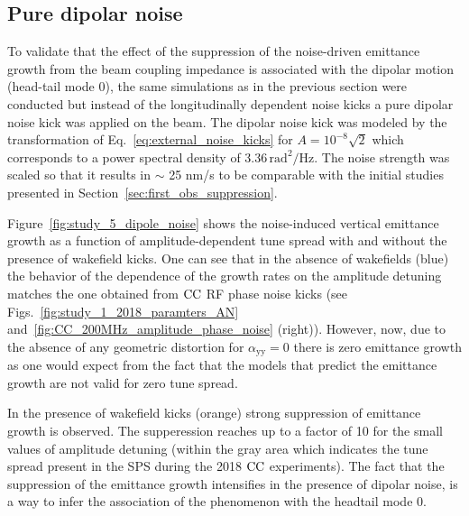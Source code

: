 

\subsection{Pure dipolar noise}\label{subsec:dipole_noise}
To validate that the effect of the suppression of the noise-driven emittance growth from the beam coupling impedance is associated with the dipolar motion (head-tail mode 0), the same simulations as in the previous section were conducted but instead of the longitudinally dependent noise kicks a pure dipolar noise kick was applied on the beam. The dipolar noise kick was modeled by the transformation of Eq.~\eqref{eq:external_noise_kicks} for $A=10^{-8} \sqrt{2}$ which corresponds to a power spectral density of 3.36\,$\mathrm{rad^2/Hz}$. The noise strength was scaled so that it results in $\sim$ 25 nm/s to be comparable with the initial studies presented in Section~\ref{sec:first_obs_suppression}.

Figure~\ref{fig:study_5_dipole_noise} shows the noise-induced vertical emittance growth as a function of amplitude-dependent tune spread with and without the presence of wakefield kicks. One can see that in the absence of wakefields (blue) the behavior of the dependence of the growth rates on the amplitude detuning matches the one obtained from ${\mathrm{CC}}$ RF phase noise kicks (see Figs.~\ref{fig:study_1_2018_paramters_AN} and~\ref{fig:CC_200MHz_amplitude_phase_noise} (right)). However, now, due to the absence of any geometric distortion for $\alpha_\mathrm{yy}=0$ there is zero emittance growth as one would expect from the fact that the models that predict the emittance growth are not valid for zero tune spread.

In the presence of wakefield kicks (orange) strong suppression of emittance growth is observed. The supperession reaches up to a factor of 10 for the small values of amplitude detuning (within the gray area which indicates the tune spread present in the SPS during the 2018 ${\mathrm{CC}}$ experiments). The fact that the suppression of the emittance growth intensifies in the presence of dipolar noise, is a way to infer the association of the phenomenon with the headtail mode 0.

